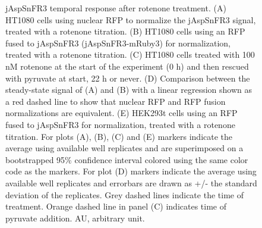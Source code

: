 \begin{figure}[ht]
    \centering
    \caption[Rotenone titration in different cell lines.]{
    jAspSnFR3 temporal response after rotenone treatment.
    (A) HT1080 cells using nuclear RFP to normalize the jAspSnFR3 signal, treated with a rotenone titration.
    (B) HT1080 cells using an RFP fused to jAspSnFR3 (jAspSnFR3-mRuby3) for normalization, treated with a rotenone titration.
    (C) HT1080 cells treated with 100 nM rotenone at the start of the experiment (0 h) and then rescued with pyruvate at start, 22 h or never.
    (D) Comparison between the steady-state signal of (A) and (B) with a linear regression shown as a red dashed line to show that nuclear RFP and RFP fusion normalizations are equivalent.
    (E) HEK293t cells using an RFP fused to jAspSnFR3 for normalization, treated with a rotenone titration.
    For plots (A), (B), (C) and (E) markers indicate the average using available well replicates and are superimposed on a bootstrapped 95\% confidence interval colored using the same color code as the markers.
    For plot (D) markers indicate the average using available well replicates and errorbars are drawn as +/- the standard deviation of the replicates.
    Grey dashed lines indicate the time of treatment.
    Orange dashed line in panel (C) indicates time of pyruvate addition.
    AU, arbitrary unit.
    }
    \label{ch3:figsupp:f2S1}
\end{figure}

